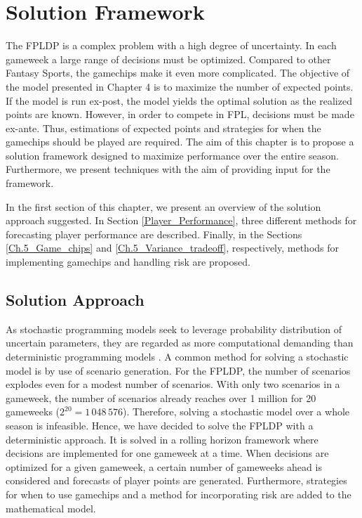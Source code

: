 

\chapter{Solution Framework} \label{chapter_solution_approach}

The FPLDP is a complex problem with a high degree of uncertainty. In each gameweek a large range of decisions must be optimized. Compared to other Fantasy Sports, the gamechips make it even more complicated. The objective of the model presented in Chapter 4 is to maximize the number of expected points. If the model is run ex-post, the model yields the optimal solution as the realized points are known. However, in order to compete in FPL, decisions must be made ex-ante. Thus, estimations of expected points and strategies for when the gamechips should be played are required. The aim of this chapter is to propose a solution framework designed to maximize performance over the entire season. Furthermore, we present techniques with the aim of providing input for the framework.

\newpar
In the first section of this chapter, we present an overview of the solution approach suggested. In Section \ref{Player_Performance}, three different methods for forecasting player performance are described. Finally, in the Sections \ref{Ch.5_Game_chips} and \ref{Ch.5_Variance_tradeoff}, respectively, methods for implementing gamechips and handling risk are proposed.


\section{Solution Approach}

As stochastic programming models seek to leverage probability distribution of uncertain parameters, they are regarded as more computational demanding than deterministic programming models \citep{Shapiro}. A common method for solving a stochastic model is by use of scenario generation. For the FPLDP, the number of scenarios explodes even for a modest number of scenarios. With only two scenarios in a gameweek, the number of scenarios already reaches over 1 million for 20 gameweeks ($2^{20} = 1\,048\,576$). Therefore, solving a stochastic model over a whole season is infeasible. Hence, we have decided to solve the FPLDP with a deterministic approach. It is solved in a rolling horizon framework where decisions are implemented for one gameweek at a time. When decisions are optimized for a given gameweek, a certain number of gameweeks ahead is considered and forecasts of player points are generated. Furthermore, strategies for when to use gamechips and a method for incorporating risk are added to the mathematical model.
\newpar


